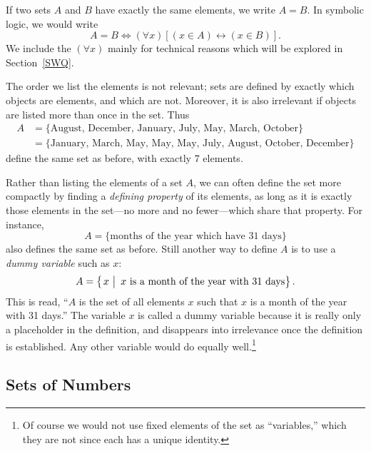 If two sets $A$ and $B$  have exactly the same elements,
we write $A=B$.  In symbolic logic, we would write
\begin{equation}A=B\iff(\forall x)[(x\in A)\longleftrightarrow (x\in B)].
\label{LogicDefinitionOfSetEquivalence}
\end{equation}
We include the $(\forall x)$ mainly for technical reasons
which will be explored in Section~\ref{SWQ}.

The order we list the elements is not relevant; sets are defined
by exactly which objects are elements, and which are not.
Moreover, it is also irrelevant if objects are listed more than
once in the set.  
Thus 
\begin{align*}
A&=\{\text{August, December, January, July, May, March, October}\}\\
&=\{\text{January, March, May, May, May, July, August, October, December}\}
\end{align*}  
define the same set as before, with exactly 7 elements.




Rather than listing the elements of a set $A$, we can often
define the set more compactly by finding a {\it defining property}
of its elements, as long as it is exactly those elements in the
set---no more and no fewer---which share that property.  For instance,
$$A=\{\text{months of the year which have 31 days}\}$$
also defines the same set as before.  Still another way to define $A$ is to
use a {\it dummy variable} such as $x$:
$$A=\left\{\left.\vphantom{x_0^9}x\ \right|\ 
x\text{ is a month of the year with 31 days}\right\}.$$ 
This is read, ``$A$ is the set of all elements $x$ such that
$x$ is a month of the year with 31 days.'' 
The variable $x$ is called a dummy variable because it is really
only a placeholder in the definition, and disappears into irrelevance
once the 
definition is established.  Any other variable would do equally
well.\footnote{Of course we would not use fixed elements of the set
as ``variables,'' which they are not since each has a unique 
identity.}  

\subsection{Sets of Numbers}

